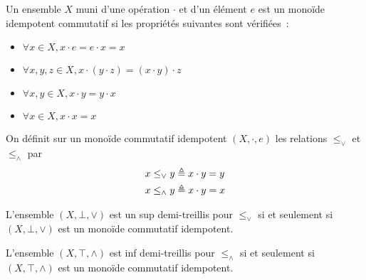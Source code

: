 \begin{definition}
  Un ensemble $X$ muni d'une opération $\cdot$ et d'un élément $e$ est un
  monoïde idempotent commutatif si les propriétés suivantes sont vérifiées~:
  \begin{itemize}
  \item $\forall x\in X, x\cdot e = e \cdot x = x$
  \item $\forall x,y,z\in X, x \cdot (y \cdot z) = (x \cdot y) \cdot z$
  \item $\forall x,y\in X, x\cdot y = y \cdot x$
  \item $\forall x\in X, x\cdot x = x$
  \end{itemize}

  On définit sur un monoïde commutatif idempotent $(X,\cdot,e)$ les relations
  $\leq_\lor$ et $\leq_\land$ par
  \begin{align*}
    x \leq_\lor y &\triangleq x \cdot y = y \\
    x \leq_\land y &\triangleq x \cdot y = x
  \end{align*}
\end{definition}

\begin{proposition}
  L'ensemble $(X,\bot,\lor)$ est un sup demi-treillis pour $\leq_\lor$ si et
  seulement si $(X,\bot,\lor)$ est un monoïde commutatif idempotent.

  L'ensemble $(X,\top,\land)$ est inf demi-treillis pour $\leq_\land$ si et
  seulement si $(X,\top,\land)$ est un monoïde commutatif idempotent.
\end{proposition}

